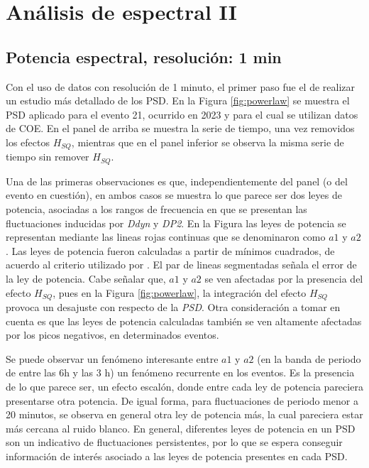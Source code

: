 \section{Análisis de espectral II}
\label{PSD2}

\subsection{Potencia espectral, resolución: 1 min}

Con el uso de datos con resolución de 1 minuto, el primer paso fue el de realizar un estudio más detallado de los PSD. En la Figura \ref{fig:powerlaw} se muestra el PSD aplicado para el evento 21, ocurrido en 2023 y para el cual se utilizan datos de COE. En el panel de arriba se muestra la serie de tiempo, una vez removidos los efectos $H_{SQ}$, mientras que en el panel inferior se observa la misma serie de tiempo sin remover $H_{SQ}$.
\vspace{1 em}

Una de las primeras observaciones es que, independientemente del panel (o del evento en cuestión), en ambos casos se muestra lo que parece ser dos leyes de potencia, asociadas a los rangos de frecuencia en que se presentan las fluctuaciones inducidas por \emph{Ddyn} y \emph{DP2}. En la Figura las leyes de potencia se representan mediante las lineas rojas continuas que se denominaron como $a1$ y $a2$. Las leyes de potencia fueron calculadas a partir de mínimos cuadrados, de acuerdo al criterio utilizado por \cite{LS_red_noise}. El par de lineas segmentadas señala el error de la ley de potencia. Cabe señalar que, $a1$ y $a2$ se ven afectadas por la presencia del efecto $H_{SQ}$, pues en la Figura \ref{fig:powerlaw}, la integración del efecto $H_{SQ}$ provoca un desajuste con respecto de la \emph{PSD}. Otra consideración a tomar en cuenta es que las leyes de potencia calculadas también se ven altamente afectadas por los picos negativos, en determinados eventos.
\vspace{1 em}

 
Se puede observar un fenómeno interesante entre $a1$ y $a2$ (en la banda de periodo de entre las 6h y las 3 h) un fenómeno recurrente en los eventos. Es la presencia de lo que parece ser, un efecto escalón, donde entre cada ley de potencia pareciera presentarse otra potencia. De igual forma, para fluctuaciones de periodo menor a 20 minutos, se observa en general otra ley de potencia más, la cual pareciera estar más cercana al ruido blanco. En general, diferentes leyes de potencia en un PSD son un indicativo de fluctuaciones persistentes, por lo que se espera conseguir información de interés asociado a las leyes de potencia presentes en cada PSD.
\vspace{1 em}

